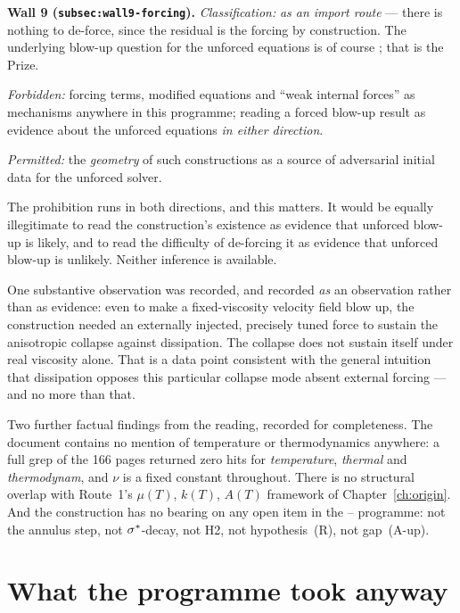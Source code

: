 \begin{record}
\textbf{Wall 9 (\texttt{subsec:wall9-forcing}).}
\emph{Classification:} \IMPOSSIBLE{} \emph{as an import route} --- there is
nothing to de-force, since the residual is the forcing by construction. The
underlying blow-up question for the unforced equations is of course \OPEN{};
that is the Prize.

\smallskip
\emph{Forbidden:} forcing terms, modified equations and ``weak internal
forces'' as mechanisms anywhere in this programme; reading a forced blow-up
result as evidence about the unforced equations \emph{in either direction}.

\smallskip
\emph{Permitted:} the \emph{geometry} of such constructions as a source of
adversarial initial data for the unforced solver.
\end{record}

The prohibition runs in both directions, and this matters. It would be equally
illegitimate to read the construction's existence as evidence that unforced
blow-up is likely, and to read the difficulty of de-forcing it as evidence that
unforced blow-up is unlikely. Neither inference is available.

One substantive observation was recorded, and recorded \emph{as} an
observation rather than as evidence: even to make a fixed-viscosity velocity
field blow up, the construction needed an externally injected, precisely tuned
force to sustain the anisotropic collapse against dissipation. The collapse
does not sustain itself under real viscosity alone. That is a data point
consistent with the general intuition that dissipation opposes this particular
collapse mode absent external forcing --- and no more than that.

Two further factual findings from the reading, recorded for completeness. The
document contains no mention of temperature or thermodynamics anywhere: a full
grep of the 166 pages returned zero hits for \emph{temperature}, \emph{thermal}
and \emph{thermodynam}, and \(\nu\) is a fixed constant throughout. There is
no structural overlap with Route~1's \(\mu(T)\), \(k(T)\), \(A(T)\) framework
of Chapter~\ref{ch:origin}. And the construction has no bearing on any open
item in the -- programme: not the annulus step, not
\(\sigma^{*}\)-decay, not H2, not hypothesis~(R), not gap~(A-up).

\section{What the programme took anyway}
\label{sec:aniso}


